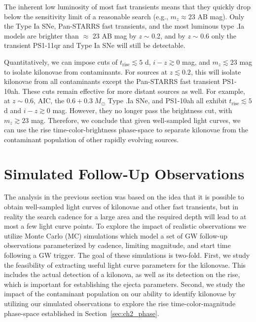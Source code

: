 The inherent low luminosity of most fast transients means that they quickly drop below the sensitivity limit of a reasonable search (e.g., $m_z \approx 23$ AB mag). Only the Type Ia SNe, Pan-STARRS fast transients, and the most luminous type .Ia models are brighter than $\approx$ 23 AB mag by {\em z} $\sim$ 0.2, and by {\em z} $\sim$ 0.6 only the transient PS1-11qr and Type Ia SNe will still be detectable.

Quantitatively, we can impose cuts of $t_{\text{rise}} \lesssim  5$ d, $i-z \gtrsim 0$ mag, and $m_z \lesssim 23$ mag to isolate kilonovae from contaminants. For sources at $z \lesssim 0.2$, this will isolate kilonovae from all contaminants except the Pan-STARRS fast transient PS1-10ah. These cuts remain effective for more distant sources as well. For example, at $z\sim0.6$, AIC, the $0.6+0.3\;M_{\odot}$ Type .Ia SNe, and PS1-10ah all exhibit $t_{\text{rise}} \lesssim  5$ d and $i-z \gtrsim 0$ mag. However, they no longer pass the brightness cut, with $m_z \gtrsim 23$ mag. Therefore, we conclude that given well-sampled light curves, we can use the rise time-color-brightness phase-space to separate kilonovae from the contaminant population of other rapidly evolving sources.

\section{Simulated Follow-Up Observations}
\label{sec:ch2_MCsims}
The analysis in the previous section was based on the idea that it is possible to obtain well-sampled light curves of kilonovae and other fast transients, but in reality the search cadence for a large area and the required depth will lead to at most a few light curve points. To explore the impact of realistic observations we utilize Monte Carlo (MC) simulations which model a set of GW follow-up observations parameterized by cadence, limiting magnitude, and start time following a GW trigger.  The goal of these simulations is two-fold. First, we study the feasibility of extracting useful light curve parameters for the kilonovae. This includes the actual detection of a kilonova, as well as its detection on the rise, which is important for establishing the ejecta parameters. Second, we study the impact of the contaminant population on our ability to identify kilonovae by utilizing our simulated observations to explore the rise time-color-magnitude phase-space established in Section~\ref{sec:ch2_phase}.

